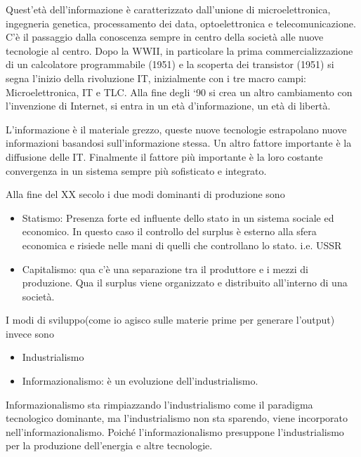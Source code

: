 \documentclass[a4page, 11pt]{article}
\begin{document}
Quest'età dell'informazione è caratterizzato dall'unione di
microelettronica, ingegneria genetica, processamento dei data,
optoelettronica e telecomunicazione. C'è il passaggio dalla conoscenza
sempre in centro della società alle nuove tecnologie al centro. Dopo la
WWII, in particolare la prima commercializzazione di un calcolatore
programmabile (1951) e la scoperta dei transistor (1951) si segna
l'inizio della rivoluzione IT, inizialmente con i tre macro campi:
Microelettronica, IT e TLC. Alla fine degli `90 si crea un altro
cambiamento con l'invenzione di Internet, si entra in un età
d'informazione, un età di libertà.

L'informazione è il materiale grezzo, queste nuove tecnologie
estrapolano nuove informazioni basandosi sull'informazione stessa. Un
altro fattore importante è la diffusione delle IT. Finalmente il fattore
più importante è la loro costante convergenza in un sistema sempre più
sofisticato e integrato.

Alla fine del XX secolo i due modi dominanti di produzione sono

\begin{itemize}
	 
	\item
	Statismo: Presenza forte ed influente dello stato in un sistema
	sociale ed economico. In questo caso il controllo del surplus è
	esterno alla sfera economica e risiede nelle mani di quelli che
	controllano lo stato. i.e. USSR
	\item
	Capitalismo: qua c'è una separazione tra il produttore e i mezzi di
	produzione. Qua il surplus viene organizzato e distribuito all'interno
	di una società.
\end{itemize}

I modi di sviluppo(come io agisco sulle materie prime per generare
l'output) invece sono

\begin{itemize}
	 
	\item
	Industrialismo
	\item
	Informazionalismo: è un evoluzione dell'industrialismo.
\end{itemize}

Informazionalismo sta rimpiazzando l'industrialismo come il paradigma
tecnologico dominante, ma l'industrialismo non sta sparendo, viene
incorporato nell'informazionalismo. Poiché l'informazionalismo
presuppone l'industrialismo per la produzione dell'energia e altre
tecnologie.
\end{document}
